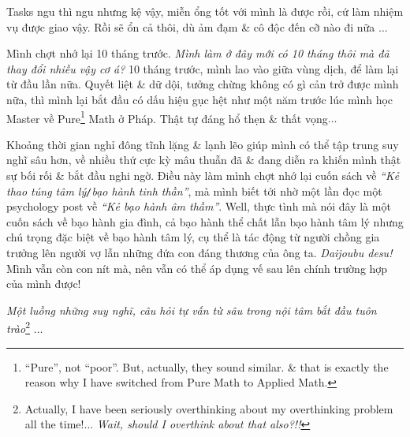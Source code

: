 \documentclass[12pt,twoside]{book}
\begin{document}
Tasks ngu thì ngu nhưng kệ vậy, miễn ổng tốt với mình là được rồi, cứ làm nhiệm vụ được giao vậy. Rồi sẽ ổn cả thôi, dù ảm đạm \& cô độc đến cỡ nào đi nữa $\ldots$

Mình chợt nhớ lại 10 tháng trước. {\it Mình làm ở đây mới có 10 tháng thôi mà đã thay đổi nhiều vậy cơ á?} 10 tháng trước, mình lao vào giữa vùng dịch, để làm lại từ đầu lần nữa. Quyết liệt \& dữ dội, tưởng chừng không có gì cản trở được mình nữa, thì mình lại bắt đầu có dấu hiệu gục hệt như một năm trước lúc mình học Master về Pure\footnote{``Pure'', not ``poor''. But, actually, they sound similar. \& that is exactly the reason why I have switched from Pure Math to Applied Math.} Math ở Pháp. Thật tự đáng hổ thẹn \& thất vọng$\ldots$

Khoảng thời gian nghỉ đông tĩnh lặng \& lạnh lẽo giúp mình có thể tập trung suy nghĩ sâu hơn, về nhiều thứ cực kỳ mâu thuẫn đã \& đang diễn ra khiến mình thật sự bối rối \& bắt đầu nghi ngờ. Điều này làm mình chợt nhớ lại cuốn sách \cite{Bancroft_why_he_do,Bancroft_why_he_do_VN} về {\it``Kẻ thao túng tâm lý{\tt/}bạo hành tinh thần''}, mà mình biết tới nhờ một lần đọc một psychology post về {\it``Kẻ bạo hành âm thầm''}. Well, thực tình mà nói đây là một cuốn sách về bạo hành gia đình, cả bạo hành thể chất lẫn bạo hành tâm lý nhưng chú trọng đặc biệt về bạo hành tâm lý, cụ thể là tác động từ người chồng gia trưởng lên người vợ lẫn những đứa con đáng thương của ông ta. {\it Daijoubu desu!} Mình vẫn còn con nít mà, nên vẫn có thể áp dụng vế sau lên chính trường hợp của mình được!

{\it Một luồng những suy nghĩ, câu hỏi tự vấn từ sâu trong nội tâm bắt đầu tuôn trào}\footnote{Actually, I have been seriously overthinking about my overthinking problem all the time!$\ldots$ {\it Wait, should I overthink about that also?!!}} $\ldots$
\end{document}

